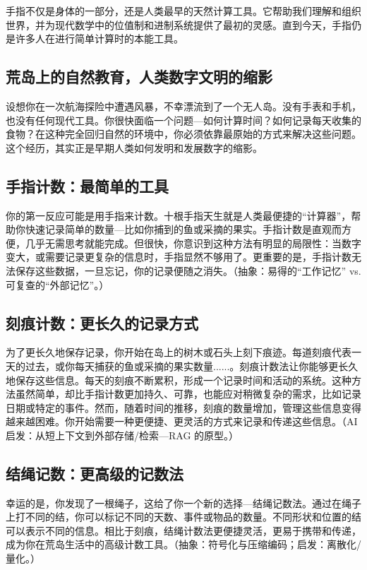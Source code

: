 手指不仅是身体的一部分，还是人类最早的天然计算工具。它帮助我们理解和组织世界，并为现代数学中的位值制和进制系统提供了最初的灵感。直到今天，手指仍是许多人在进行简单计算时的本能工具。

\subsection{荒岛上的自然教育，人类数字文明的缩影}
设想你在一次航海探险中遭遇风暴，不幸漂流到了一个无人岛。没有手表和手机，也没有任何现代工具。你很快面临一个问题---如何计算时间？如何记录每天收集的食物？在这种完全回归自然的环境中，你必须依靠最原始的方式来解决这些问题。这个经历，其实正是早期人类如何发明和发展数字的缩影。

\subsection*{手指计数：最简单的工具}
你的第一反应可能是用手指来计数。十根手指天生就是人类最便捷的“计算器”，帮助你快速记录简单的数量---比如你捕到的鱼或采摘的果实。手指计数是直观而方便，几乎无需思考就能完成。但很快，你意识到这种方法有明显的局限性：当数字变大，或需要记录更复杂的信息时，手指显然不够用了。更重要的是，手指计数无法保存这些数据，一旦忘记，你的记录便随之消失。{（抽象：易得的“工作记忆” vs. 可复查的“外部记忆”。）}

\subsection*{刻痕计数：更长久的记录方式}
为了更长久地保存记录，你开始在岛上的树木或石头上刻下痕迹。每道刻痕代表一天的过去，或你每天捕获的鱼或采摘的果实数量......。刻痕计数法让你能够更长久地保存这些信息。每天的刻痕不断累积，形成一个记录时间和活动的系统。这种方法虽然简单，却比手指计数更加持久、可靠，也能应对稍微复杂的需求，比如记录日期或特定的事件。然而，随着时间的推移，刻痕的数量增加，管理这些信息变得越来越困难。你开始需要一种更便捷、更灵活的方式来记录和传递这些信息。{（AI 启发：从短上下文到外部存储/检索---RAG 的原型。）}

\subsection*{结绳记数：更高级的记数法}
幸运的是，你发现了一根绳子，这给了你一个新的选择---结绳记数法。通过在绳子上打不同的结，你可以标记不同的天数、事件或物品的数量。不同形状和位置的结可以表示不同的信息。相比于刻痕，结绳计数法更便捷灵活，更易于携带和传递，成为你在荒岛生活中的高级计数工具。{（抽象：符号化与压缩编码；启发：离散化/量化。）}

